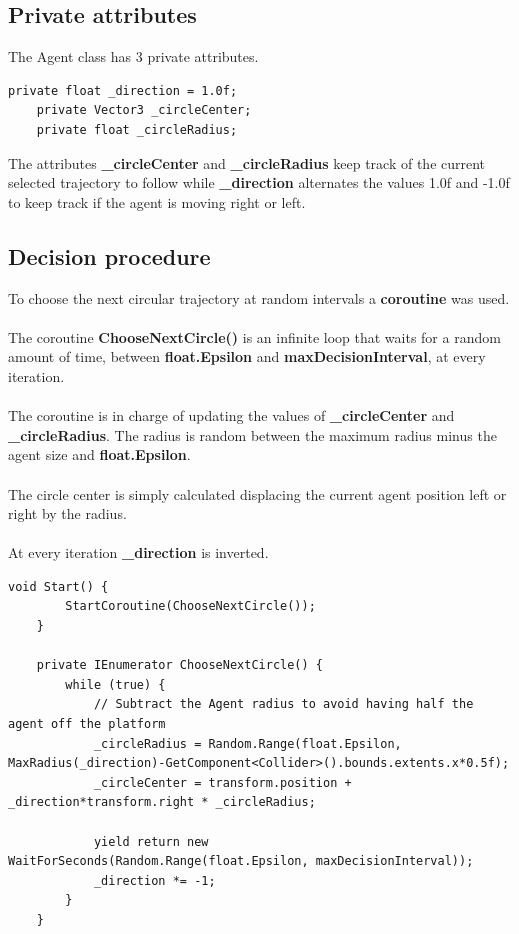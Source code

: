 \documentclass[12pt, a4paper]{article}
\begin{document}
\subsection{Private attributes}
The Agent class has 3 private attributes.
\begin{lstlisting}[caption={Private attributes}]
    private float _direction = 1.0f;
    private Vector3 _circleCenter;
    private float _circleRadius;
\end{lstlisting}
The attributes \textbf{\_circleCenter} and \textbf{\_circleRadius} keep track of the current selected trajectory to follow while \textbf{\_direction} alternates the values 1.0f and -1.0f to keep track if the agent is moving right or left.

\subsection{Decision procedure}
To choose the next circular trajectory at random intervals a \textbf{coroutine} was used.\\\\
The coroutine \textbf{ChooseNextCircle()} is an infinite loop that waits for a random amount of time, between \textbf{float.Epsilon} and \textbf{maxDecisionInterval}, at every iteration.\\\\
The coroutine is in charge of updating the values of \textbf{\_circleCenter} and \textbf{\_circleRadius}. The radius is random between the maximum radius minus the agent size and \textbf{float.Epsilon}.\\\\
The circle center is simply calculated displacing the current agent position left or right by the radius.\\\\
At every iteration \textbf{\_direction} is inverted.

\begin{lstlisting}[caption={Decision procedure}]
    void Start() {
        StartCoroutine(ChooseNextCircle());
    }

    private IEnumerator ChooseNextCircle() {
        while (true) {
            // Subtract the Agent radius to avoid having half the agent off the platform
            _circleRadius = Random.Range(float.Epsilon, MaxRadius(_direction)-GetComponent<Collider>().bounds.extents.x*0.5f);
            _circleCenter = transform.position + _direction*transform.right * _circleRadius;

            yield return new WaitForSeconds(Random.Range(float.Epsilon, maxDecisionInterval));
            _direction *= -1;
        }
    }
\end{lstlisting}
\end{document}

